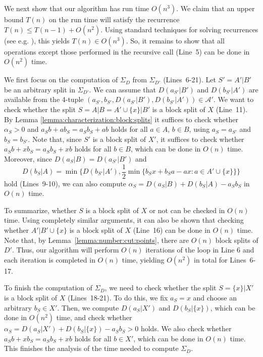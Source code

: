 \documentclass[12pt]{article}
\begin{document}
We next show that our algorithm has run time \(O(n^3)\).
We claim that an upper bound \(T(n)\) on the run time
will satisfy the recurrence \(T(n) \leq T(n-1) + O(n^2)\).
Using standard techniques for solving recurrences 
(see e.g. \cite{cormen:intro:algorithms:2001}),
this yields \(T(n) \in O(n^3)\). So, it remains to show
that all operations except those performed in the recursive call (Line~5)
can be done in \(O(n^2)\) time. 

We first focus on the computation of \(\Sigma_D\) from \(\Sigma_{D'}\) (Lines~6-21).
Let \(S'=A'|B'\) be an arbitrary split in \(\Sigma_{D'}\). We can assume
that \(D(a_{S'}|B')\) and \(D(b_{S'}|A')\) are available 
from the 4-tuple \((a_{S'},b_{S'},D(a_{S'}|B'),D(b_{S'}|A')) \in \mathcal{A}'\).
We want to check whether the split 
\(S = A|B = A' \cup \{x\}|B'\) is a block split of \(X\) (Line~11).
By Lemma \ref{lemma:characterization:block:splits} it suffices to check
whether \(\alpha_S>0\)
and \(a_Sb + ab_S = a_Sb_S + ab\) holds for all \(a \in A\), \(b \in B\),
using \(a_S = a_{S'}\) and \(b_S = b_{S'}\).
Note that, since \(S'\) is a block split of \(X'\), it suffices to
check whether \(a_Sb + xb_S = a_Sb_S + xb\) holds for all \(b \in B\), which can
be done in \(O(n)\) time. 
Moreover, since 
\(D(a_S|B) = D(a_{S'}|B')\) and
\[
D(b_S|A) = \min \{D(b_{S'}|A'), 
                             \frac{1}{2} \min \{b_Sx+b_Sa-ax:a \in A' \cup \{x\}\}\}
\]
hold (Lines~9-10), we can also compute
\(\alpha_S = D(a_S|B) + D(b_S|A) - a_Sb_S\) in \(O(n)\) time. 

To summarize, whether \(S\) is a block split of \(X\) or not
can be checked in \(O(n)\) time. Using completely similar arguments, it can
also be shown that checking whether \(A'|B' \cup \{x\}\) is a block split of \(X\) (Line~16)
can be done in \(O(n)\) time. Note that, by Lemma~\ref{lemma:number:cut:points}, 
there are \(O(n)\) block splits of \(D'\).
Thus, our algorithm will perform \(O(n)\) iterations of the loop in Line 6 
and each iteration is completed in \(O(n)\) time, yielding \(O(n^2)\) in total
for Lines~6-17.

To finish the computation of \(\Sigma_D\), we need to check whether
the split \(S = \{x\}|X'\) is a block split of \(X\) (Lines~18-21). 
To do this, we fix \(a_S = x\) and choose an arbitrary \(b_S \in X'\).
Then, we compute \(D(a_S|X')\) and \(D(b_S|\{x\})\),
which can be done in \(O(n^2)\) time, and check whether 
\(\alpha_S = D(a_S|X') + D(b_S|\{x\}) - a_Sb_S > 0\) holds.
We also check whether \(a_Sb + xb_S = a_Sb_S + xb\) holds for all \(b \in X'\),
which can be done in \(O(n)\) time. 
This finishes the analysis of the time needed to compute \(\Sigma_D\).
\end{document}
